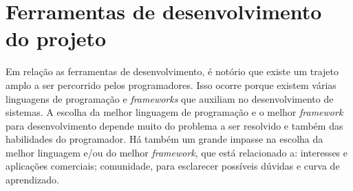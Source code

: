 \section{\textbf{Ferramentas de desenvolvimento do projeto}}
\label{ferramentas-de-desenvolvimento-do-projeto}

Em relação as ferramentas de desenvolvimento, é notório que existe um trajeto amplo a ser percorrido pelos programadores. Isso ocorre porque existem várias linguagens de programação e \textit{frameworks} que auxiliam no desenvolvimento de sistemas. A escolha da melhor linguagem de programação e o melhor \textit{framework} para desenvolvimento depende muito do problema a ser resolvido e também das habilidades do programador. Há também um grande impasse na escolha da melhor linguagem e/ou do melhor \textit{framework}, que está relacionado a: interesses e aplicações comerciais; comunidade, para esclarecer possíveis dúvidas e curva de aprendizado.







%



